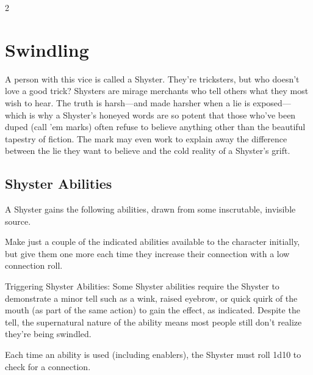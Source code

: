 \begin{multicols}{2}

\section{Swindling}

A person with this vice is called a Shyster. They’re tricksters, but who doesn’t love a good trick? Shysters are mirage merchants who tell others what they most wish to hear. The truth is harsh—and made harsher when a lie is exposed—which is why a Shyster’s honeyed words are so potent that those who’ve been duped (call ’em marks) often refuse to believe anything other than the beautiful tapestry of fiction. The mark may even work to explain away the difference
between the lie they want to believe and the cold reality of a Shyster’s grift.

\subsection{Shyster Abilities}
 
A Shyster gains the following abilities, drawn from some inscrutable, invisible source. 

Make just a couple of the indicated abilities available to the character initially, but give them one more each time they increase their connection with a low connection roll. 

Triggering Shyster Abilities: Some Shyster abilities require the Shyster to demonstrate a minor tell such as a wink, raised eyebrow, or quick quirk of the mouth (as part of the same action) to gain the effect, as indicated. Despite the tell, the supernatural nature of the ability means most people still don’t realize they’re being swindled. 

Each time an ability is used (including enablers), the Shyster must roll 1d10 to check for a connection.


\end{multicols}
